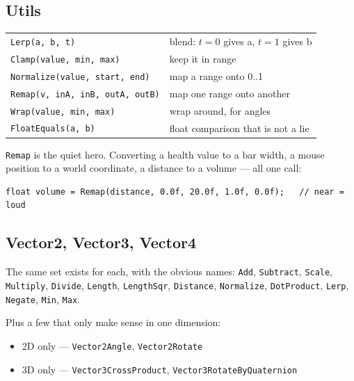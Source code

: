 \subsection{Utils}

\begin{center}
\begin{tabular}{@{}ll@{}}
\toprule
\lstinline|Lerp(a, b, t)| & blend: $t=0$ gives a, $t=1$ gives b \\
\lstinline|Clamp(value, min, max)| & keep it in range \\
\lstinline|Normalize(value, start, end)| & map a range onto 0..1 \\
\lstinline|Remap(v, inA, inB, outA, outB)| & map one range onto another \\
\lstinline|Wrap(value, min, max)| & wrap around, for angles \\
\lstinline|FloatEquals(a, b)| & float comparison that is not a lie \\
\bottomrule
\end{tabular}
\end{center}

\lstinline|Remap| is the quiet hero. Converting a health value to a bar width, a
mouse position to a world coordinate, a distance to a volume --- all one call:

\begin{lstlisting}
float volume = Remap(distance, 0.0f, 20.0f, 1.0f, 0.0f);   // near = loud
\end{lstlisting}

\subsection{Vector2, Vector3, Vector4}

The same set exists for each, with the obvious names:
\lstinline|Add|, \lstinline|Subtract|, \lstinline|Scale|, \lstinline|Multiply|,
\lstinline|Divide|, \lstinline|Length|, \lstinline|LengthSqr|,
\lstinline|Distance|, \lstinline|Normalize|, \lstinline|DotProduct|,
\lstinline|Lerp|, \lstinline|Negate|, \lstinline|Min|, \lstinline|Max|.

Plus a few that only make sense in one dimension:

\begin{itemize}[leftmargin=*,itemsep=2pt]
  \item 2D only --- \lstinline|Vector2Angle|, \lstinline|Vector2Rotate|
  \item 3D only --- \lstinline|Vector3CrossProduct|,
        \lstinline|Vector3RotateByQuaternion|
\end{itemize}

